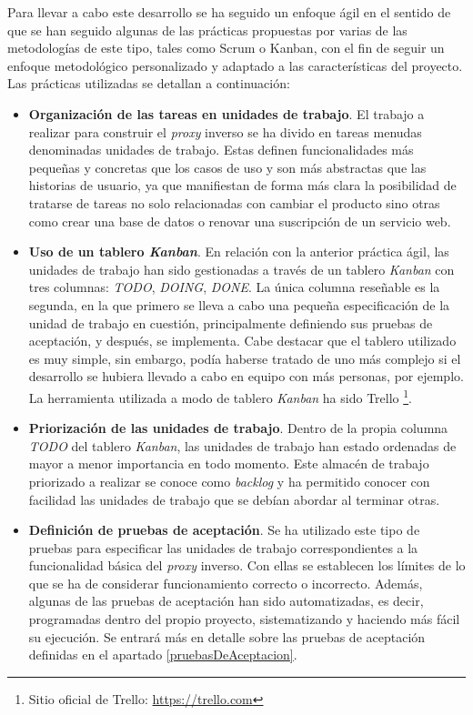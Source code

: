 \documentclass[11pt,spanish,listoffigures]{tfgetsinf}
\begin{document}
Para llevar a cabo este desarrollo se ha seguido un enfoque ágil en el sentido de que se han seguido algunas de las prácticas propuestas por varias de las metodologías de este tipo, tales como Scrum o Kanban, con el fin de seguir un enfoque metodológico personalizado y adaptado a las características del proyecto. Las prácticas utilizadas se detallan a continuación:

\begin{itemize}

	\item \textbf{Organización de las tareas en unidades de trabajo}. El trabajo a realizar para construir el \emph{proxy} inverso se ha divido en tareas menudas denominadas unidades de trabajo. Estas definen funcionalidades más pequeñas y concretas que los casos de uso y son más abstractas que las historias de usuario, ya que manifiestan de forma más clara la posibilidad de tratarse de tareas no solo relacionadas con cambiar el producto sino otras como crear una base de datos o renovar una suscripción de un servicio web.

	\item \textbf{Uso de un tablero \emph{Kanban}}. En relación con la anterior práctica ágil, las unidades de trabajo han sido gestionadas a través de un tablero \emph{Kanban} con tres columnas: \emph{TODO}, \emph{DOING}, \emph{DONE}. La única columna reseñable es la segunda, en la que primero se lleva a cabo una pequeña especificación de la unidad de trabajo en cuestión, principalmente definiendo sus pruebas de aceptación, y después, se implementa. Cabe destacar que el tablero utilizado es muy simple, sin embargo, podía haberse tratado de uno más complejo si el desarrollo se hubiera llevado a cabo en equipo con más personas, por ejemplo. La herramienta utilizada a modo de tablero \emph{Kanban} ha sido Trello \footnote{Sitio oficial de Trello: \url{https://trello.com}}.

	\item \textbf{Priorización de las unidades de trabajo}. Dentro de la propia columna \emph{TODO} del tablero \emph{Kanban}, las unidades de trabajo han estado ordenadas de mayor a menor importancia en todo momento. Este almacén de trabajo priorizado a realizar se conoce como \emph{backlog} y ha permitido conocer con facilidad las unidades de trabajo que se debían abordar al terminar otras.

	\item \textbf{Definición de pruebas de aceptación}. Se ha utilizado este tipo de pruebas para especificar las unidades de trabajo correspondientes a la funcionalidad básica del \emph{proxy} inverso. Con ellas se establecen los límites de lo que se ha de considerar funcionamiento correcto o incorrecto. Además, algunas de las pruebas de aceptación han sido automatizadas, es decir, programadas dentro del propio proyecto, sistematizando y haciendo más fácil su ejecución. Se entrará más en detalle sobre las pruebas de aceptación definidas en el apartado \ref{pruebasDeAceptacion}.


\end{itemize}
\end{document}
